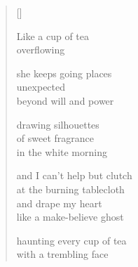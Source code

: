 \documentclass[12pt,a4paper]{article}
\begin{document}
\thispagestyle{empty}

\poemtitle{}

\settowidth{\versewidth}{Like a make-believe ghost}

\bigskip

\begin{verse}[\versewidth]

Like a cup of tea \\
overflowing

she keeps going places \\
unexpected \\
beyond will and power

drawing silhouettes \\
of sweet fragrance \\
in the white morning

and I can't help but clutch \\
at the burning tablecloth \\
and drape my heart \\
like a make-believe ghost

haunting every cup of tea \\
with a trembling face
\end{verse}
\end{document}
